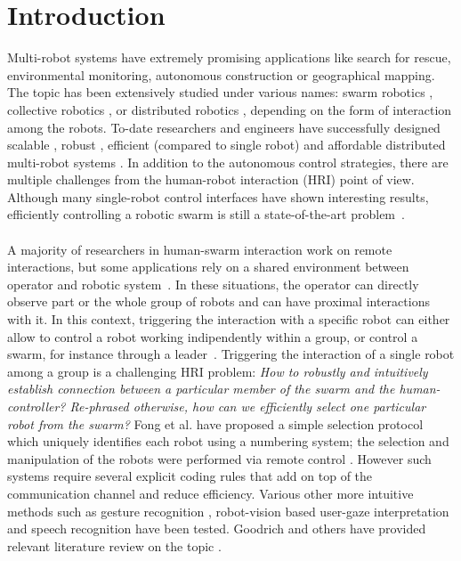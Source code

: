 \documentclass[smallextended]{svjour3}
\begin{document}
\section{Introduction}
\label{sec:introduction}
Multi-robot systems have extremely promising applications like search for rescue, environmental monitoring, autonomous construction or geographical mapping. 
The topic has been extensively studied under various names: swarm robotics \cite{brambilla2013}, collective robotics \cite{kernbach2013handbook}, or distributed robotics \cite{martinoli2012distributed}, depending on the form of interaction among the robots. 
To-date researchers and engineers have successfully designed scalable \cite{rubenstein2012kilobot}, robust \cite{winfield2006safety}, efficient (compared to single robot) \cite{Bonani2012} and affordable distributed multi-robot systems \cite{rubenstein2014programmable}. 
In addition to the autonomous control strategies, there are multiple challenges from the human-robot interaction (HRI) point of view. 
Although many single-robot control interfaces have shown interesting results, efficiently controlling a robotic swarm is still a state-of-the-art problem~\cite{Kolling2016}.\\
\\
A majority of researchers in human-swarm interaction work on remote interactions, but some applications rely on a shared environment between operator and robotic system~\cite{Kolling2016}. 
In these situations, the operator can directly observe part or the whole group of robots and can have proximal interactions with it. 
In this context, triggering the interaction with a specific robot can either allow to control a robot working indipendently within a group, or control a swarm, for instance through a leader~\cite{Goodrich2012}.
Triggering the interaction of a single robot among a group is a challenging HRI problem: \textit{How to robustly and intuitively establish connection between a particular member of the swarm and the human-controller? Re-phrased otherwise, how can we efficiently select one particular robot from the swarm?} Fong et al. have proposed a simple selection protocol which uniquely identifies each robot using a numbering system; the selection and manipulation of the robots were performed via remote control \cite{fong2003}. 
However such systems require several explicit coding rules that add on top of the communication channel and reduce efficiency. 
Various other more intuitive methods such as gesture recognition \cite{Couture-Beil2010,Jones2010,Monajjemi2013,Nagietal2014}, robot-vision based user-gaze interpretation \cite{Couture-Beil2010,Monajjemi2013,Pourmehr2013} and speech recognition \cite{Pourmehr2013} have been tested. Goodrich and others have provided relevant literature review on the topic \cite{goodrich2007human,Rule2012,yanco2004classifying}.\\
\end{document}
